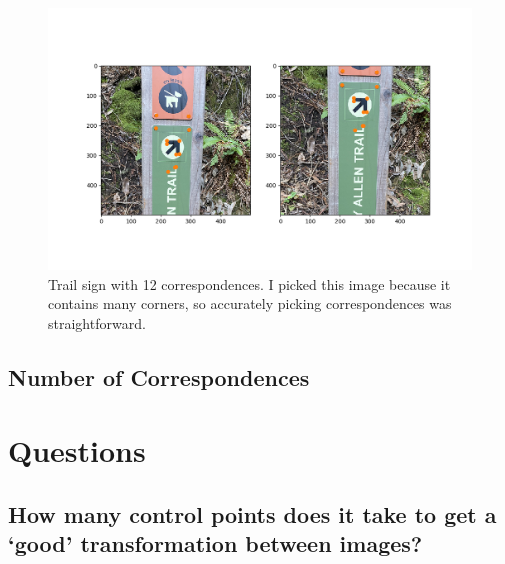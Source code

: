 \documentclass[]{article}
\begin{document}
		\begin{figure}[H]
			\centering
			\includegraphics[width=6.5in]{test_images/sign_12_correspondences.png}
			\caption{Trail sign with 12 correspondences. I picked this image because it contains many corners, so accurately picking correspondences was straightforward.}
		\end{figure}
	
	\subsection{Number of Correspondences}
	\newpage
	
\section{Questions}
	\subsection{How many control points does it take to get a `good' transformation between images?}
\end{document}
